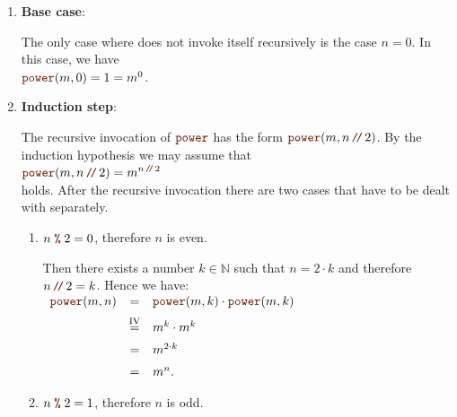\begin{enumerate}
\item \textbf{Base case}:

      The only case where  does not invoke itself recursively is the case $n = 0$.  
      In this case, we have
      \\[0.2cm]
      \hspace*{1.3cm} 
      $\mytt{power}(m,0) = 1 =  m^0$. \mycheck
\item \textbf{Induction step}:

      The recursive invocation of $\mytt{power}$ has the form
      $\mytt{power}(m,n \dv 2)$.  By the induction hypothesis we may assume that 
      \\[0.2cm]
      \hspace*{1.3cm}
      $\displaystyle \mytt{power}(m,n \dv 2) = m^{n \dvv 2}$ 
      \\[0.2cm]
      holds.  After the recursive invocation there are two cases that have to be dealt with separately.
      \begin{enumerate}
      \item $n \;\mytt{\%}\; 2 = 0$, therefore $n$ is even.

            Then there exists a number $k \in \mathbb{N}$ such that $n = 2 \cdot k$ and therefore
            $n \dv 2 = k$.
            Hence we have:
            \\[0.2cm]
            \hspace*{1.3cm}
           $ 
            \begin{array}{lcl}
            \mytt{power}(m,n) & = & \mytt{power}(m,k) \cdot \mytt{power}(m,k) \\[0.2cm]
                                & \stackrel{\mathrm{IV}}{=} & m^k \cdot m^k  \\[0.2cm]
                                & = & m^{2\cdot k} \\[0.2cm]
                                & = & m^{n}.
            \end{array}
            $            
      \item $n \;\mytt{\%}\; 2 = 1$, therefore $n$ is odd.


\end{enumerate}
\end{enumerate}
